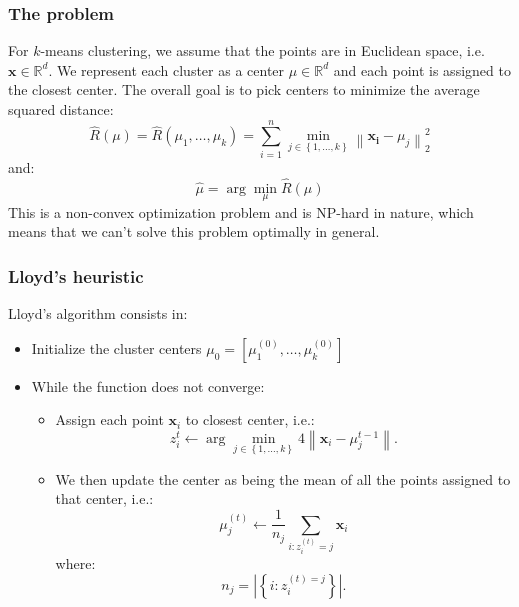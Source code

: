 \documentclass[a4paper,10pt,twoside]{article}
\newcommand\norm[1]{\left\lVert#1\right\rVert}
\begin{document}
\subsubsection{The problem}

For $k$-means clustering, we assume that the points are in Euclidean space, i.e. $\mathbf{x}\in\mathbb{R}^{d}$. We represent each cluster as a center $\mu\in\mathbb{R}^d$ and each point is assigned to the closest center. The overall goal is to pick centers to minimize the average squared distance:
\begin{equation*}
    \hat{R}(\mu)=\hat{R}(\mu_1, \ldots, \mu_k) = \sum_{i=1}^{n}\min_{j\in\left\{1,\ldots,k\right\}}\norm{\mathbf{x_i}-\mu_j}_2^2
\end{equation*}
and:
\begin{equation*}
    \hat{\mu}=\arg\min_{\mu}\hat{R}(\mu)
\end{equation*}
This is a non-convex optimization problem and is NP-hard in nature, which means that we can't solve this problem optimally in general.

\subsubsection{Lloyd's heuristic}
Lloyd's algorithm consists in:
\begin{itemize}
    \item Initialize the cluster centers $\mu_0=[\mu_1^{(0)},\ldots,\mu_k^{(0)}]$
    \item While the function does not converge:
    \begin{itemize}
        \item Assign each point $\mathbf{x}_i$ to closest center, i.e.:
        \begin{equation*}
            z_i^{t}\leftarrow \arg\min_{j\in\left\{1,\ldots,k\right\}}4\norm{\mathbf{x}_i-\mu_j^{t-1}}.
        \end{equation*}
        \item We then update the center as being the mean of all the points assigned to that center, i.e.:
        \begin{equation*}
            \mu_j^{(t)}\leftarrow\frac{1}{n_j}\sum_{i:z_i^{(t)}=j}\mathbf{x}_i
        \end{equation*}
        where:
        \begin{equation*}
            n_j=\left|\left\{i:z_i^{(t)=j}\right\}\right|.
        \end{equation*}
    \end{itemize}
\end{itemize}
\end{document}
